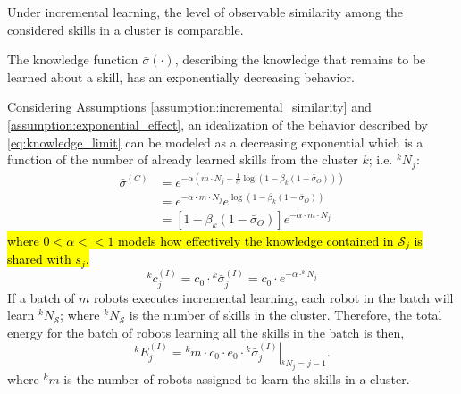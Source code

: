 \Xhline{5\arrayrulewidth}
\begin{tcolorbox}
	\begin{assumption}\label{assumption:incremental_similarity} Under incremental learning, the level of observable similarity among the considered skills in a cluster is comparable.
	\end{assumption}
\end{tcolorbox}
\begin{tcolorbox}
	\begin{assumption}\label{assumption:exponential_effect} The knowledge function $\bar{\sigma}(\cdot)$, describing the knowledge that remains to be learned about a skill, has an exponentially decreasing behavior.
	\end{assumption}
\end{tcolorbox} 
Considering Assumptions \ref{assumption:incremental_similarity} and \ref{assumption:exponential_effect}, an idealization of the behavior described by \eqref{eq:knowledge_limit} can be modeled as a decreasing exponential which is a function of the number of already learned skills from the cluster $k$; i.e. ${^kN_j}$:
\begin{align}
    \bar{\sigma}^{(C)} &= e^{-\alpha  \left(m \cdot N_j - \frac{1}{\alpha}  \log\left( 1- \beta_k(1 - \bar{\sigma}_O) \right) \right)}\\
         &= e^{-\alpha  \cdot m \cdot N_j}e^{  \log\left( 1-\beta_k(1 - \bar{\sigma}_O) \right) }\\
         &= \left[1-\beta_k \left( 1 - \bar{\sigma}_O \right)\right]e^{-\alpha \cdot m\cdot N_j}
\end{align}
\hl{where $ 0<\alpha<<1$ models how effectively the knowledge contained in $\mathcal{S}_j$ is shared with $s_j$.} 
\begin{equation}\label{eq:complexity_TL}
  {^k}c^{(I)}_j = c_0 \cdot {^k}\bar{\sigma}^{(I)}_j = c_0 \cdot e^{-\alpha \cdot ^kN_{j}}
\end{equation}
If a batch of $m$ robots executes incremental learning, each robot in the batch will learn $^kN_\mathcal{S}$; where ${^kN_\mathcal{S}}$ is the number of skills in the cluster. Therefore, the total energy for the batch of robots learning all the skills in the batch is then,
\begin{equation}
  {^k}E^{(I)}_j = {^km} \cdot c_0 \cdot e_0 \cdot \left.{^k}\bar{\sigma}^{(I)}_j \right\vert_{{^k}N_j = j-1}.
\end{equation}
where ${^km}$ is the number of robots assigned to learn the skills in a cluster.  

